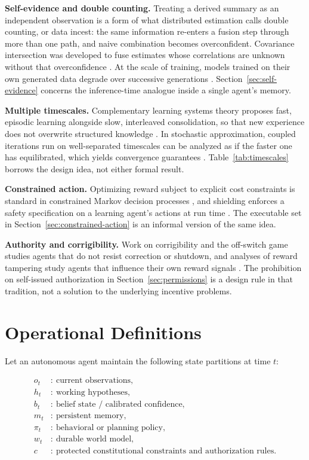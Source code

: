 \documentclass[11pt]{article}
\begin{document}
\textbf{Self-evidence and double counting.} Treating a derived summary as an independent observation is a form of what distributed estimation calls double counting, or data incest: the same information re-enters a fusion step through more than one path, and naive combination becomes overconfident. Covariance intersection was developed to fuse estimates whose correlations are unknown without that overconfidence \cite{julier1997}. At the scale of training, models trained on their own generated data degrade over successive generations \cite{shumailov2024}. Section~\ref{sec:self-evidence} concerns the inference-time analogue inside a single agent's memory.

\textbf{Multiple timescales.} Complementary learning systems theory proposes fast, episodic learning alongside slow, interleaved consolidation, so that new experience does not overwrite structured knowledge \cite{mcclelland1995}. In stochastic approximation, coupled iterations run on well-separated timescales can be analyzed as if the faster one has equilibrated, which yields convergence guarantees \cite{borkar1997}. Table~\ref{tab:timescales} borrows the design idea, not either formal result.

\textbf{Constrained action.} Optimizing reward subject to explicit cost constraints is standard in constrained Markov decision processes \cite{altman1999}, and shielding enforces a safety specification on a learning agent's actions at run time \cite{alshiekh2018}. The executable set in Section~\ref{sec:constrained-action} is an informal version of the same idea.

\textbf{Authority and corrigibility.} Work on corrigibility \cite{soares2015} and the off-switch game \cite{hadfield2017} studies agents that do not resist correction or shutdown, and analyses of reward tampering study agents that influence their own reward signals \cite{everitt2021}. The prohibition on self-issued authorization in Section~\ref{sec:permissions} is a design rule in that tradition, not a solution to the underlying incentive problems.

\section{Operational Definitions}

Let an autonomous agent maintain the following state partitions at time $t$:

\begin{align}
    o_t &:\ \text{current observations},\\
    h_t &:\ \text{working hypotheses},\\
    b_t &:\ \text{belief state / calibrated confidence},\\
    m_t &:\ \text{persistent memory},\\
    \pi_t &:\ \text{behavioral or planning policy},\\
    w_t &:\ \text{durable world model},\\
    c &:\ \text{protected constitutional constraints and authorization rules}.
\end{align}
\end{document}
